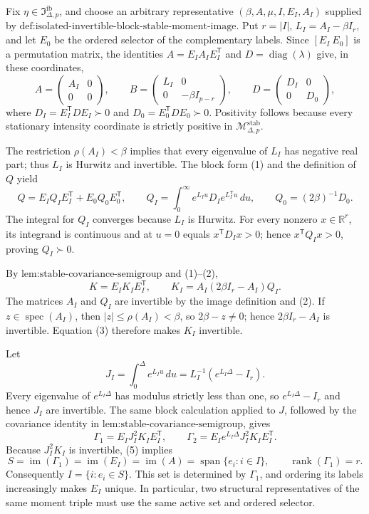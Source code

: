Fix \(\eta\in\mathfrak I_{\Delta,p}^{\mathrm{ib}}\), and choose an arbitrary representative \((\beta,A,\mu,I,E_I,A_I)\) supplied by \(\text{def:isolated-invertible-block-stable-moment-image}\).  Put \(r=|I|\), \(L_I=A_I-\beta I_r\), and let \(E_0\) be the ordered selector of the complementary labels.  Since \([E_I\ E_0]\) is a permutation matrix, the identities \(A=E_IA_IE_I^{\mathsf T}\) and \(D=\operatorname{diag}(\lambda)\) give, in these coordinates,
\[
 A=\begin{pmatrix}A_I&0\\0&0\end{pmatrix},\qquad
 B=\begin{pmatrix}L_I&0\\0&-\beta I_{p-r}\end{pmatrix},\qquad
 D=\begin{pmatrix}D_I&0\\0&D_0\end{pmatrix},
\tag{1}
\]
where \(D_I=E_I^{\mathsf T}DE_I\succ0\) and \(D_0=E_0^{\mathsf T}DE_0\succ0\).  Positivity follows because every stationary intensity coordinate is strictly positive in \(\mathcal M_{\Delta,p}^{\mathrm{stab}}\).

The restriction \(\rho(A_I)<\beta\) implies that every eigenvalue of \(L_I\) has negative real part; thus \(L_I\) is Hurwitz and invertible.  The block form (1) and the definition of \(Q\) yield
\[
 Q=E_IQ_IE_I^{\mathsf T}+E_0Q_0E_0^{\mathsf T},\qquad
 Q_I=\int_0^\infty e^{L_Iu}D_Ie^{L_I^{\mathsf T}u}\,du,\qquad
 Q_0=(2\beta)^{-1}D_0.
\tag{2}
\]
The integral for \(Q_I\) converges because \(L_I\) is Hurwitz.  For every nonzero \(x\in\mathbb R^r\), its integrand is continuous and at \(u=0\) equals \(x^{\mathsf T}D_Ix>0\); hence \(x^{\mathsf T}Q_Ix>0\), proving \(Q_I\succ0\).

By \(\text{lem:stable-covariance-semigroup}\) and (1)--(2),
\[
 K=E_IK_IE_I^{\mathsf T},\qquad
 K_I=A_I(2\beta I_r-A_I)Q_I.
\tag{3}
\]
The matrices \(A_I\) and \(Q_I\) are invertible by the image definition and (2).  If \(z\in\operatorname{spec}(A_I)\), then \(|z|\leq\rho(A_I)<\beta\), so \(2\beta-z\neq0\); hence \(2\beta I_r-A_I\) is invertible.  Equation (3) therefore makes \(K_I\) invertible.

Let
\[
 J_I=\int_0^\Delta e^{L_Iu}\,du=L_I^{-1}(e^{L_I\Delta}-I_r).
\tag{4}
\]
Every eigenvalue of \(e^{L_I\Delta}\) has modulus strictly less than one, so \(e^{L_I\Delta}-I_r\) and hence \(J_I\) are invertible.  The same block calculation applied to \(J\), followed by the covariance identity in \(\text{lem:stable-covariance-semigroup}\), gives
\[
 \Gamma_1=E_IJ_I^2K_IE_I^{\mathsf T},\qquad
 \Gamma_2=E_Ie^{L_I\Delta}J_I^2K_IE_I^{\mathsf T}.
\tag{5}
\]
Because \(J_I^2K_I\) is invertible, (5) implies
\[
 S=\operatorname{im}(\Gamma_1)=\operatorname{im}(E_I)
 =\operatorname{im}(A)=\operatorname{span}\{e_i:i\in I\},\qquad
 \operatorname{rank}(\Gamma_1)=r.
\tag{6}
\]
Consequently \(I=\{i:e_i\in S\}\).  This set is determined by \(\Gamma_1\), and ordering its labels increasingly makes \(E_I\) unique.  In particular, two structural representatives of the same moment triple must use the same active set and ordered selector.

